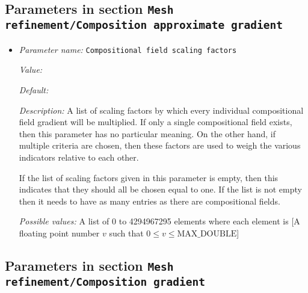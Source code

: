 \subsection{Parameters in section \tt Mesh refinement/Composition approximate gradient}
\label{parameters:Mesh_20refinement/Composition_20approximate_20gradient}

\begin{itemize}
\item {\it Parameter name:} {\tt Compositional field scaling factors}
\label{parameters:Mesh refinement/Composition approximate gradient/Compositional field scaling factors}


{\it Value:} 


{\it Default:} 


{\it Description:} A list of scaling factors by which every individual compositional field gradient will be multiplied. If only a single compositional field exists, then this parameter has no particular meaning. On the other hand, if multiple criteria are chosen, then these factors are used to weigh the various indicators relative to each other. 

If the list of scaling factors given in this parameter is empty, then this indicates that they should all be chosen equal to one. If the list is not empty then it needs to have as many entries as there are compositional fields.


{\it Possible values:} A list of 0 to 4294967295 elements where each element is [A floating point number $v$ such that $0 \leq v \leq \text{MAX\_DOUBLE}$]
\end{itemize}

\subsection{Parameters in section \tt Mesh refinement/Composition gradient}
\label{parameters:Mesh_20refinement/Composition_20gradient}

